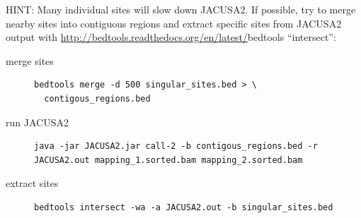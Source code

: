 \documentclass[10pt,a4paper]{article}
\begin{document}
HINT: Many individual sites will slow down JACUSA2. If possible, try to merge nearby sites into
contiguous regions and extract specific sites from JACUSA2 output with \url{http://bedtools.readthedocs.org/en/latest/}{bedtools} 
``intersect'':
\begin{description}
\item[merge sites] \begin{verbatim} 
bedtools merge -d 500 singular_sites.bed > \ 
  contigous_regions.bed
\end{verbatim}

\item[run JACUSA2] \begin{verbatim} 
java -jar JACUSA2.jar call-2 -b contigous_regions.bed -r
JACUSA2.out mapping_1.sorted.bam mapping_2.sorted.bam
\end{verbatim}

\item[extract sites] \begin{verbatim}
bedtools intersect -wa -a JACUSA2.out -b singular_sites.bed
\end{verbatim}
\end{description}
\end{document}
